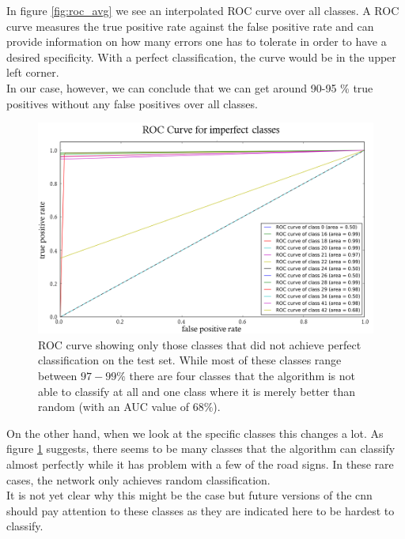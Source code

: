 \documentclass[11pt,a4paper]{article}
\begin{document}
In figure \ref{fig:roc_avg} we see an interpolated ROC curve over all classes. A ROC curve measures the true positive rate against the false positive rate and can provide information on how many errors one has to tolerate in order to have a desired specificity. With a perfect classification, the curve would be in the upper left corner.\\
In our case, however, we can conclude that we can get around 90-95 \% true positives without any false positives over all classes.
\begin{figure}[h!]
	\includegraphics[width=\textwidth]{roc_imperfect.png}
	\centering
	\caption[ROC Curve for imperfect classes]{ROC curve showing only those classes that did not achieve perfect classification on the test set. While most of these classes range between $97 - 99 \%$ there are four classes that the algorithm is not able to classify at all and one class where it is merely better than random (with an AUC value of $68\%$).}
	\label{fig:roc_imp}
\end{figure}

On the other hand, when we look at the specific classes this changes a lot. As figure \ref{fig:roc_imp} suggests, there seems to be many classes that the algorithm can classify almost perfectly while it has problem with a few of the road signs. In these rare cases, the network only achieves random classification.\\
It is not yet clear why this might be the case but future versions of the cnn should pay attention to these classes as they are indicated here to be hardest to classify.
\end{document}
